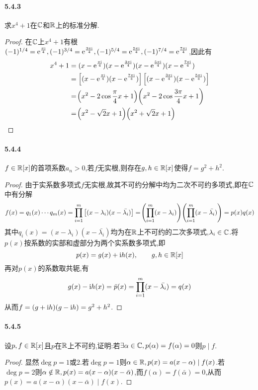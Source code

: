 \documentclass[11pt]{article}
\begin{document}
\paragraph{5.4.3}求$x^4+1$在$\mathbb{C}$和$\mathbb{R}$上的标准分解.
\begin{proof}
    在$\mathbb{C}$上$x^4+1$有根$(-1)^{1/4}=\mathrm{e}^{\frac{\pi\mathrm{i}}{4}}, (-1)^{3/4}=\mathrm{e}^{\frac{3\pi\mathrm{i}}{4}},(-1)^{5/4}=\mathrm{e}^{\frac{5\pi\mathrm{i}}{4}},(-1)^{7/4}=\mathrm{e}^{\frac{7\pi\mathrm{i}}{4}}$,因此有
    $$\begin{aligned}
        x^4+1&=(x-\mathrm{e}^{\frac{\pi\mathrm{i}}{4}})(x-\mathrm{e}^{\frac{3\pi\mathrm{i}}{4}})(x-\mathrm{e}^{\frac{5\pi\mathrm{i}}{4}})(x-\mathrm{e}^{\frac{7\pi\mathrm{i}}{4}})\\
        &=\left[(x-\mathrm{e}^{\frac{\pi\mathrm{i}}{4}})(x-\mathrm{e}^{\frac{7\pi\mathrm{i}}{4}})\right]\left[(x-\mathrm{e}^{\frac{3\pi\mathrm{i}}{4}})(x-\mathrm{e}^{\frac{5\pi\mathrm{i}}{4}})\right]\\
        &=\!\left(x^2-2\cos\frac{\pi}{4}x+1\right)\!\left(x^2-2\cos\frac{3\pi}{4}x+1\right)\\
        &=\!\left(x^2-\sqrt{2}x+1\right)\!\left(x^2+\sqrt{2}x+1\right)
    \end{aligned}$$
\end{proof}
\paragraph{5.4.4}$f\in \mathbb{R}[x]$的首项系数$a_n>0$,若$f$无实根,则存在$g,h\in \mathbb{R}[x]$使得$f=g^2+h^2$.
\begin{proof}
    由于实系数多项式$f$无实根,故其不可约分解中均为二次不可约多项式,即在$\mathbb{C}$中有分解
    $$f(x)=q_1(x)\cdots q_m(x)=\prod_{i=1}^m \left[(x-\lambda_i)(x-\bar{\lambda_i})\right]=\!\left(\prod_{i=1}^m (x-\lambda_i)\right)\!\left(\prod_{i=1}^m (x-\bar{\lambda_i})\right)=p(x)q(x)$$
    其中$q_i(x)=(x-\lambda_i)(x-\bar{\lambda_i})$均为在$\mathbb{R}$上不可约的二次多项式,$\lambda_i\in\mathbb{C}$.将$p(x)$按系数的实部和虚部分为两个实系数多项式,即
    $$p(x)=g(x)+\mathrm{i} h(x), \qquad g,h\in \mathbb{R}[x]$$
    再对$p(x)$的系数取共轭,有
    $$g(x)-\mathrm{i} h(x)=\bar{p}(x)=\prod_{i=1}^m (x-\bar{\lambda_i})=q(x)$$
    从而$f=(g+\mathrm{i} h)(g-\mathrm{i} h)=g^2+h^2$.
\end{proof}
\paragraph{5.4.5}设$p,f\in \mathbb{R}[x]$且$p$在$\mathbb{R}$上不可约,证明:若$\exists\alpha\in\mathbb{C}, p(\alpha)=f(\alpha)=0$则$p\mid f$.
\begin{proof}
    显然$\deg p=1$或2.若$\deg p=1$则$\alpha\in\mathbb{R}, p(x)=a(x-\alpha)\mid f(x)$.若$\deg p=2$则$\alpha\notin\mathbb{R}, p(x)=a(x-\alpha)(x-\bar{\alpha})$,而$f(\alpha)=f(\bar{\alpha})=0$,从而$p(x)=a(x-\alpha)(x-\bar{\alpha})\mid f(x)$.
\end{proof}
\end{document}
